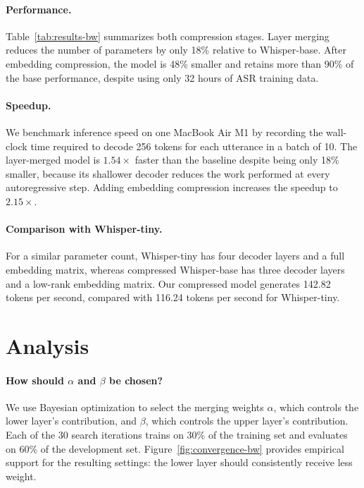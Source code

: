 \paragraph{Performance.}
Table~\ref{tab:results-bw} summarizes both compression stages. Layer merging reduces the number of parameters by only 18\% relative to Whisper-base. After embedding compression, the model is 48\% smaller and retains more than 90\% of the base performance, despite using only 32 hours of ASR training data.

\paragraph{Speedup.}
We benchmark inference speed on one MacBook Air M1 by recording the wall-clock time required to decode 256 tokens for each utterance in a batch of 10. The layer-merged model is \(1.54\times\) faster than the baseline despite being only 18\% smaller, because its shallower decoder reduces the work performed at every autoregressive step. Adding embedding compression increases the speedup to \(2.15\times\).

\paragraph{Comparison with Whisper-tiny.}
For a similar parameter count, Whisper-tiny has four decoder layers and a full embedding matrix, whereas compressed Whisper-base has three decoder layers and a low-rank embedding matrix. Our compressed model generates 142.82 tokens per second, compared with 116.24 tokens per second for Whisper-tiny.

\section{Analysis}

\paragraph{How should \(\alpha\) and \(\beta\) be chosen?}
We use Bayesian optimization to select the merging weights \(\alpha\), which controls the lower layer's contribution, and \(\beta\), which controls the upper layer's contribution. Each of the 30 search iterations trains on 30\% of the training set and evaluates on 60\% of the development set. Figure~\ref{fig:convergence-bw} provides empirical support for the resulting settings: the lower layer should consistently receive less weight.


